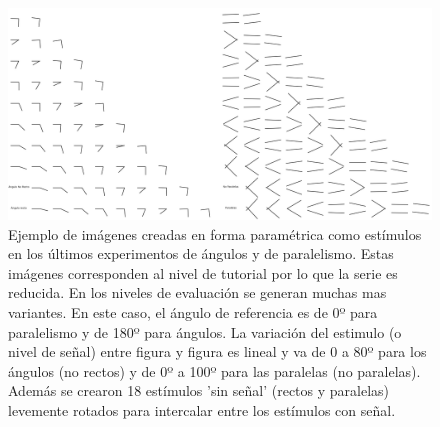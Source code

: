 \documentclass{article}
\begin{document}
        
    \begin{figure}
        \center
        \includegraphics[width=\textwidth]{Imagenes/Estimulos.png}
        \caption{Ejemplo de imágenes creadas en forma paramétrica como estímulos en los últimos experimentos de ángulos y de paralelismo. Estas imágenes corresponden al nivel de tutorial por lo que la serie es reducida. En los niveles de evaluación se generan muchas mas variantes. En este caso, el ángulo de referencia es de 0º para paralelismo y de 180º para ángulos. La variación del estimulo (o nivel de señal) entre figura y figura es lineal y va de 0 a 80º para los ángulos (no rectos) y de 0º a 100º para las paralelas (no paralelas). Además se crearon 18 estímulos 'sin señal' (rectos y paralelas) levemente rotados para intercalar entre los estímulos con señal.}
        \label{fig:Estimulos}
    \end{figure}
    
\end{document}
